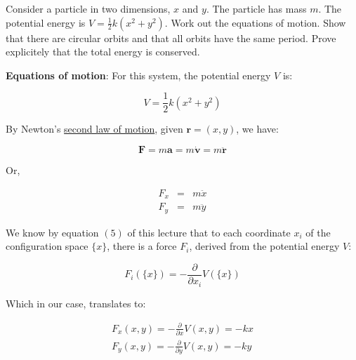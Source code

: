 \documentclass[solutions.tex]{subfiles}
\begin{document}
\maketitle
\begin{exercise}
Consider a particle in two dimensions,
$x$ and $y$. The particle has mass $m$. The potential energy
is $V=\frac{1}{2}k(x^2+y^2)$. Work out the equations of motion.
Show that there are circular orbits and that all orbits have
the same period. Prove explicitely that the total energy is
conserved.
\end{exercise}

\hfill \break

\textbf{Equations of motion}: For this system, the potential
energy $V$ is:

\begin{equation}
\label{eqn:L05E02:epot}
V = \frac12k(x^2+y^2)
\end{equation}

By Newton's \href{https://en.wikipedia.org/wiki/Newton\%27s\_laws\_of\_motion\#Second}{
second law of motion}, given $\bm{r}=(x,y)$, we have:

\begin{equation}
	\bm{F} = m\bm{a} = m\dot{\bm{v}} = m\ddot{\bm{r}}
\end{equation}

Or,

\begin{equation}
	\label{eqn:L05E02:n2l}
	\begin{aligned}
		F_x &=& m\ddot{x} \\
		F_y &=& m\ddot{y}
	\end{aligned}
\end{equation}

We know by equation $(5)$ of this lecture that to each coordinate
$x_i$ of the configuration space $\{x\}$, there is a force $F_i$,
derived from the potential energy $V$:

\begin{equation}
	F_i(\{x\}) = -\frac{\partial}{\partial x_i}V(\{x\})
\end{equation}

Which in our case, translates to:

\begin{equation}
	\label{eqn:L05E02:fp}
	\begin{aligned}
		F_x(x, y) = -\frac{\partial}{\partial x}V(x, y) = -kx \\
		F_y(x, y) = -\frac{\partial}{\partial y}V(x, y) = -ky
	\end{aligned}
\end{equation}
\end{document}
